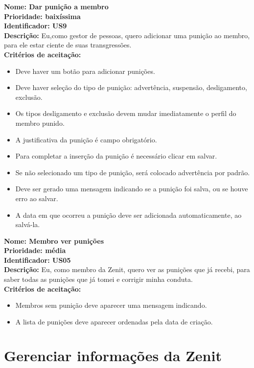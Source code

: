 \begin{anexosenv}
\textbf{Nome: Dar punição a membro\\
Prioridade: baixíssima\\
Identificador: US9\\
Descrição:} Eu,como gestor de pessoas, quero adicionar uma punição ao membro, para ele estar ciente de suas transgressões.\\
\textbf{Critérios de aceitação:}
\begin{itemize}
    \item Deve haver um botão para adicionar punições.
    \item Deve haver seleção do tipo de punição: advertência, suspensão, desligamento, exclusão.
    \item Os tipos desligamento e exclusão devem mudar imediatamente o perfil do membro punido.
    \item A justificativa da punição é campo obrigatório.
    \item Para completar a inserção da punição é necessário clicar em salvar.
    \item Se não selecionado um tipo de punição, será colocado advertência por padrão.
    \item Deve ser gerado uma mensagem indicando se a punição foi salva, ou se houve erro ao salvar.
    \item A data em que ocorreu a punição deve ser adicionada automaticamente, ao salvá-la.
\end{itemize}

\textbf{Nome: Membro ver punições\\
Prioridade: média\\
Identificador: US05\\
Descrição: }Eu, como membro da Zenit, quero ver as punições que já recebi, para saber todas as punições que já tomei e corrigir minha conduta.\\
\textbf{Critérios de aceitação:}
\begin{itemize}
    \item Membros sem punição deve aparecer uma mensagem indicando.
    \item A lista de punições deve aparecer ordenadas pela data de criação.
\end{itemize}


\section{Gerenciar informações da Zenit}

\end{anexosenv}
